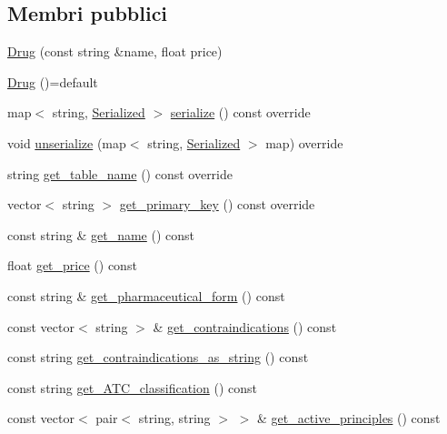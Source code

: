 \subsection*{Membri pubblici}
\begin{DoxyCompactItemize}
\item 
\hyperlink{classmm_1_1model_1_1_drug_a23f6e0538f52bd77fb8fa511392889a6}{Drug} (const string \&name, float price)
\item 
\hyperlink{classmm_1_1model_1_1_drug_a60cb5ecb3ed21da2f7f7e8bc94a1019d}{Drug} ()=default
\item 
map$<$ string, \hyperlink{structmm_1_1_serialized}{Serialized} $>$ \hyperlink{classmm_1_1model_1_1_drug_a5d4fa5bf5e4700f833547c5114764c7b}{serialize} () const override
\item 
void \hyperlink{classmm_1_1model_1_1_drug_adc9cd19eb2d0c3c271c01c41cf10d600}{unserialize} (map$<$ string, \hyperlink{structmm_1_1_serialized}{Serialized} $>$ map) override
\item 
string \hyperlink{classmm_1_1model_1_1_drug_a7fa9dbb569b89f397d4b865b778b3751}{get\+\_\+table\+\_\+name} () const override
\item 
vector$<$ string $>$ \hyperlink{classmm_1_1model_1_1_drug_a019770ab95f95f34bbc204c4c3860bfa}{get\+\_\+primary\+\_\+key} () const override
\item 
const string \& \hyperlink{classmm_1_1model_1_1_drug_ac01bfb91a074b57a3ba3b5b6f567e726}{get\+\_\+name} () const
\item 
float \hyperlink{classmm_1_1model_1_1_drug_a0add6ee0680f5028d0e820033ebada20}{get\+\_\+price} () const
\item 
const string \& \hyperlink{classmm_1_1model_1_1_drug_a2435614b64f13687d25b04f7d9335c9a}{get\+\_\+pharmaceutical\+\_\+form} () const
\item 
const vector$<$ string $>$ \& \hyperlink{classmm_1_1model_1_1_drug_a9116e111f2a546dbc35fd5e08863f37a}{get\+\_\+contraindications} () const
\item 
const string \hyperlink{classmm_1_1model_1_1_drug_a71f9f7d210a2fd7fbad86e61affd9105}{get\+\_\+contraindications\+\_\+as\+\_\+string} () const
\item 
const string \hyperlink{classmm_1_1model_1_1_drug_a64a1e99b4702d83b9c94379d14b4873b}{get\+\_\+\+A\+T\+C\+\_\+classification} () const
\item 
const vector$<$ pair$<$ string, string $>$ $>$ \& \hyperlink{classmm_1_1model_1_1_drug_a809666171510a2511573fa65d4dcd7cb}{get\+\_\+active\+\_\+principles} () const
\item 

\end{DoxyCompactItemize}
